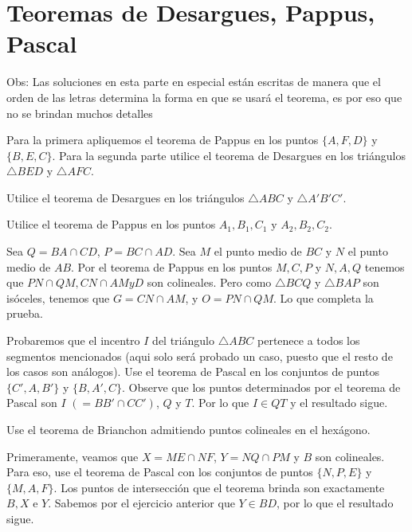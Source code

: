 \section{Teoremas de Desargues, Pappus, Pascal}

Obs: Las soluciones en esta parte en especial est\'an escritas de manera que el orden de las letras determina la forma en que se usar\'a el teorema, es por eso que no se brindan muchos detalles
\begin{sol}
	Para la primera apliquemos el teorema de Pappus en los puntos $\{A, F, D\}$ y $\{B, E, C\}$. Para la segunda parte utilice el teorema de Desargues en los tri\'angulos $\triangle BED$ y $\triangle AFC$.
\end{sol}

\begin{sol}
	Utilice el teorema de Desargues en los tri\'angulos $\triangle ABC$ y $\triangle A'B'C'$. 
\end{sol}

\begin{sol}
	Utilice el teorema de Pappus en los puntos $A_{1}, B_{1}, C_{1}$ y $A_{2}, B_{2}, C_{2}$. 
\end{sol}

\begin{sol}
	Sea $Q =BA \cap CD$, $P = BC \cap AD$. Sea $M$ el punto medio de $BC$ y $N$ el punto medio de $AB$. Por el teorema de Pappus en los puntos $M, C, P $ y $N, A, Q$ tenemos que $PN\cap QM, CN \cap AM y D$ son colineales. Pero como $\triangle BCQ$ y $\triangle BAP$ son is\'oceles, tenemos que $G = CN \cap AM$, y $ O = PN \cap QM$. Lo que completa la prueba.
\end{sol}

\begin{sol}
	Probaremos que el incentro $I$ del tri\'angulo $\triangle ABC$ pertenece a todos los segmentos mencionados (aqui solo ser\'a probado un caso, puesto que el resto de los casos son an\'alogos). Use el teorema de Pascal en los conjuntos de puntos $\{C', A, B'\}$ y $\{B, A', C\}$. Observe que los puntos determinados por el teorema de Pascal son $I$ $(= BB' \cap CC')$, $Q$ y $T$. Por lo que $I\in QT$ y el resultado sigue.
\end{sol}

\begin{sol}
	Use el teorema de Brianchon admitiendo puntos colineales en el hex\'agono.
\end{sol}


\begin{sol}
	Primeramente, veamos que $X = ME\cap NF$, $Y = NQ \cap PM$ y $B$ son colineales. Para eso, use el teorema de Pascal con los conjuntos de puntos $\{N, P, E\}$ y $\{M, A, F\}$. Los puntos de intersecci\'on que el teorema brinda son exactamente $B, X$ e $Y$. Sabemos por el ejercicio anterior que $Y\in BD$, por lo que el resultado sigue.
\end{sol}

